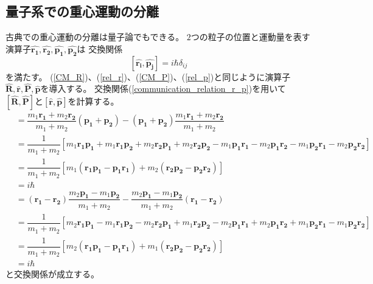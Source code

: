 \documentclass[a4paper,16pt]{jsarticle}
\begin{document}
\subsection{量子系での重心運動の分離}\label{CM_separation}
古典での重心運動の分離は量子論でもできる。
$2$つの粒子の位置と運動量を表す演算子$\hat{\bm{r_1}},\hat{\bm{r_2}},\hat{\bm{p_1}},\hat{\bm{p_2}}$は
交換関係
\begin{equation}
	\label{communication_relation_r_p}
	[\hat{\bm{r_i}},\hat{\bm{p_j}}] = i\hbar\delta_{ij}
\end{equation}
を満たす。
(\ref{CM_R})、(\ref{rel_r})、(\ref{CM_P})、(\ref{rel_p})と同じように演算子$\hat{\bm{R}},\hat{\bm{r}},\hat{\bm{P}},\hat{\bm{p}}$を導入する。
交換関係(\ref{communication_relation_r_p})を用いて$[\hat{\bm{R}},\hat{\bm{P}}]$と$[\hat{\bm{r}},\hat{\bm{p}}]$を計算する。
\begin{align}
	[\hat{\bm{R}},\hat{\bm{P}}]
	&= \dfrac{m_1\bm{r_1} + m_2\bm{r_2}}{m_1 + m_2}(\bm{p_1} + \bm{p_2}) - (\bm{p_1} + \bm{p_2})\dfrac{m_1\bm{r_1} + m_2\bm{r_2}}{m_1 + m_2}\\
	&= \dfrac{1}{m_1 + m_2}[m_1\bm{r_1}\bm{p_1} + m_1\bm{r_1}\bm{p_2} + m_2\bm{r_2}\bm{p_1} + m_2\bm{r_2}\bm{p_2}
	- m_1\bm{p_1}\bm{r_1} - m_2\bm{p_1}\bm{r_2} - m_1\bm{p_2}\bm{r_1} - m_2\bm{p_2}\bm{r_2}] \\
	&= \dfrac{1}{m_1 + m_2}[ m_1(\bm{r_1}\bm{p_1} - \bm{p_1}\bm{r_1}) + m_2(\bm{r_2}\bm{p_2} - \bm{p_2}\bm{r_2})] \\
	&= i\hbar
\end{align}
\begin{align}
	[\hat{\bm{r}},\hat{\bm{p}}]
	&= (\bm{r_1} - \bm{r_2})\dfrac{m_2\bm{p_1} - m_1\bm{p_2}}{m_1 + m_2} - \dfrac{m_2\bm{p_1} - m_1\bm{p_2}}{m_1 + m_2}(\bm{r_1} - \bm{r_2}) \\
	&= \dfrac{1}{m_1 + m_2}[m_2\bm{r_1}\bm{p_1} - m_1\bm{r_1}\bm{p_2} - m_2\bm{r_2}\bm{p_1} + m_1\bm{r_2}\bm{p_2}
	- m_2\bm{p_1}\bm{r_1} + m_2\bm{p_1}\bm{r_2} + m_1\bm{p_2}\bm{r_1} - m_1\bm{p_2}\bm{r_2}] \\
	&= \dfrac{1}{m_1 + m_2}[m_2(\bm{r_1}\bm{p_1} - \bm{p_1}\bm{r_1}) + m_1(\bm{r_2}\bm{p_2} - \bm{p_2}\bm{r_2})] \\
	&= i\hbar
\end{align}
と交換関係が成立する。
\end{document}
